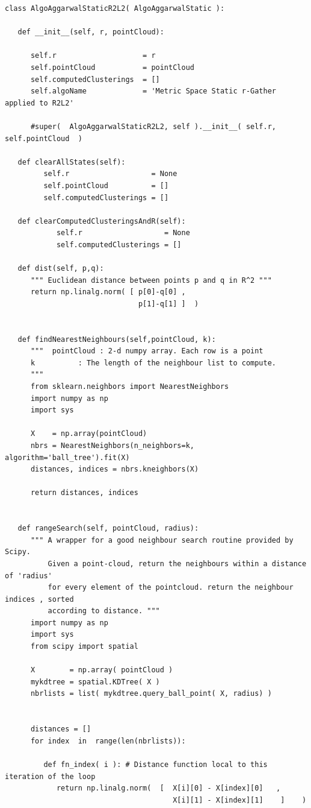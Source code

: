 \documentclass[11pt]{article}
\begin{document}
\begin{verbatim}
class AlgoAggarwalStaticR2L2( AlgoAggarwalStatic ):

   def __init__(self, r, pointCloud):

      self.r                    = r     
      self.pointCloud           = pointCloud 
      self.computedClusterings  = []  
      self.algoName             = 'Metric Space Static r-Gather applied to R2L2'

      #super(  AlgoAggarwalStaticR2L2, self ).__init__( self.r, self.pointCloud  )

   def clearAllStates(self):
         self.r                   = None
         self.pointCloud          = [] 
         self.computedClusterings = []

   def clearComputedClusteringsAndR(self):
            self.r                   = None
            self.computedClusterings = []

   def dist(self, p,q):
      """ Euclidean distance between points p and q in R^2 """
      return np.linalg.norm( [ p[0]-q[0] , 
                               p[1]-q[1] ]  )


   def findNearestNeighbours(self,pointCloud, k):
      """  pointCloud : 2-d numpy array. Each row is a point
      k          : The length of the neighbour list to compute. 
      """
      from sklearn.neighbors import NearestNeighbors
      import numpy as np
      import sys

      X    = np.array(pointCloud)
      nbrs = NearestNeighbors(n_neighbors=k, algorithm='ball_tree').fit(X)
      distances, indices = nbrs.kneighbors(X)

      return distances, indices


   def rangeSearch(self, pointCloud, radius):
      """ A wrapper for a good neighbour search routine provided by Scipy.
          Given a point-cloud, return the neighbours within a distance of 'radius'
          for every element of the pointcloud. return the neighbour indices , sorted 
          according to distance. """
      import numpy as np
      import sys
      from scipy import spatial

      X        = np.array( pointCloud )
      mykdtree = spatial.KDTree( X )
      nbrlists = list( mykdtree.query_ball_point( X, radius) )


      distances = []
      for index  in  range(len(nbrlists)):

         def fn_index( i ): # Distance function local to this iteration of the loop
            return np.linalg.norm(  [  X[i][0] - X[index][0]   , 
                                       X[i][1] - X[index][1]    ]    )


\end{verbatim}
\end{document}
